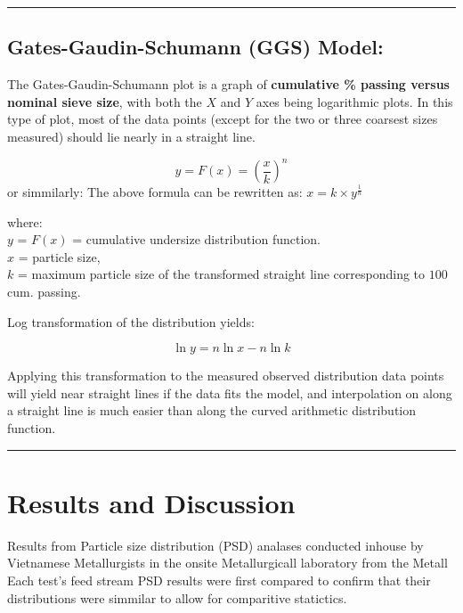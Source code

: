 \documentclass[
]{article}
\begin{document}
\begin{center}\rule{0.5\linewidth}{0.5pt}\end{center}

\hypertarget{gates-gaudin-schumann-ggs-model}{%
\subsection{Gates-Gaudin-Schumann (GGS)
Model:}\label{gates-gaudin-schumann-ggs-model}}

The Gates-Gaudin-Schumann plot is a graph of \textbf{cumulative \%
passing versus nominal sieve size}, with both the \(X\) and \(Y\) axes
being logarithmic plots. In this type of plot, most of the data points
(except for the two or three coarsest sizes measured) should lie nearly
in a straight line.

\[y = F(x) = \left(\frac{x}{k}\right) ^n\] or simmilarly: The above
formula can be rewritten as: \(x = k \times y ^ \frac{1}{n}\)

where:\\
\(y\) = \(F \left(x\right)\) = cumulative undersize distribution
function.\\
\(x\) = particle size,\\
\(k\) = maximum particle size of the transformed straight line
corresponding to \(100%
\) cum. passing.

Log transformation of the distribution yields:

\[\ln y = n \ln x - n \ln k\]

Applying this transformation to the measured observed distribution data
points will yield near straight lines if the data fits the model, and
interpolation on along a straight line is much easier than along the
curved arithmetic distribution function.

\begin{center}\rule{0.5\linewidth}{0.5pt}\end{center}

\hypertarget{results-and-discussion}{%
\section{Results and Discussion}\label{results-and-discussion}}

Results from Particle size distribution (PSD) analases conducted inhouse
by Vietnamese Metallurgists in the onsite Metallurgicall laboratory from
the Metall Each test's feed stream PSD results were first compared to
confirm that their distributions were simmilar to allow for comparitive
statictics.
\end{document}
